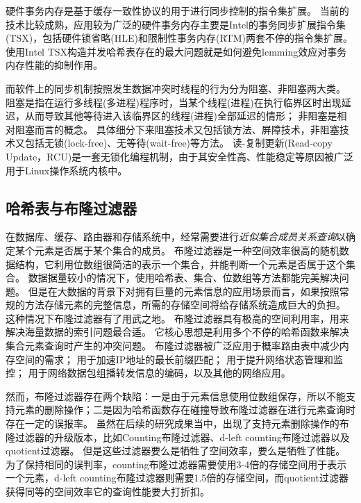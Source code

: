 硬件事务内存是基于缓存一致性协议的用于进行同步控制的指令集扩展。
当前的技术比较成熟，应用较为广泛的硬件事务内存主要是Intel的事务同步扩展指令集(TSX)\cite{tsx}，包括硬件锁省略(HLE)和限制性事务内存(RTM)两套不停的指令集扩展。
使用Intel TSX构造并发哈希表存在的最大问题就是如何避免lemming效应对事务内存性能的抑制作用。

而软件上的同步机制按照发生数据冲突时线程的行为分为阻塞、非阻塞两大类。
阻塞是指在运行多线程(多进程)程序时，当某个线程(进程)在执行临界区时出现延迟，从而导致其他等待进入该临界区的线程(进程)全部延迟的情形；
非阻塞是相对阻塞而言的概念。
具体细分下来阻塞技术又包括锁方法、屏障技术，非阻塞技术又包括无锁(lock-free)、无等待(wait-free)等方法。
读-复制更新(Read-copy Update，RCU)是一套无锁化编程机制，由于其安全性高、性能稳定等原因被广泛用于Linux操作系统内核中\cite{mckenney2003kernel,mckenney2004scaling,mckenney2013rcu}。

\subsection{哈希表与布隆过滤器}

在数据库、缓存、路由器和存储系统中，经常需要进行\textit{近似集合成员关系查询}以确定某个元素是否属于某个集合的成员。
布隆过滤器是一种空间效率很高的随机数据结构，它利用位数组很简洁的表示一个集合，并能判断一个元素是否属于这个集合。
数据据量较小的情况下，使用哈希表、集合、位数组等方法都能完美解决问题。
但是在大数据的背景下对拥有巨量的元素信息的应用场景而言，如果按照常规的方法存储元素的完整信息，所需的存储空间将给存储系统造成巨大的负担。
这种情况下布隆过滤器有了用武之地。
布隆过滤器具有极高的空间利用率，用来解决海量数据的索引问题最合适。
它核心思想是利用多个不停的哈希函数来解决集合元素查询时产生的冲突问题。
布隆过滤器被广泛应用于概率路由表中减少内存空间的需求\cite{yu2009buffalo}；
用于加速IP地址的最长前缀匹配\cite{dharmapurikar2003longest}；
用于提升网络状态管理和监控\cite{bonomi2006beyond,song2005fast}；
用于网络数据包组播转发信息的编码\cite{jokela2009lipsin}，以及其他的网络应用\cite{broder2004network}。

然而，布隆过滤器存在两个缺陷：一是由于元素信息使用位数组保存，所以不能支持元素的删除操作；二是因为哈希函数存在碰撞导致布隆过滤器在进行元素查询时存在一定的误报率。
虽然在后续的研究成果当中，出现了支持元素删除操作的布隆过滤器的升级版本，比如Counting布隆过滤器\cite{fan2000summary}、d-left counting布隆过滤器\cite{bonomi2006improved}以及quotient过滤器\cite{bender2012don}。
但是这些过滤器要么是牺牲了空间效率，要么是牺牲了性能。
为了保持相同的误判率，counting布隆过滤器需要使用3-4倍的存储空间用于表示一个元素，d-left counting布隆过滤器则需要1.5倍的存储空间，而quotient过滤器获得同等的空间效率它的查询性能要大打折扣。

